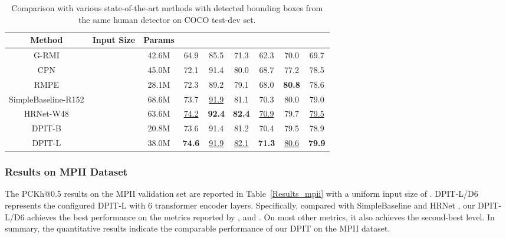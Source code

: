 \documentclass[runningheads]{llncs}
\begin{document}
\begin{center}
\begin{table}
  \caption{Comparison with various state-of-the-art methods with detected bounding boxes from the same human detector on COCO test-dev set.}
  \label{test_coco}
  \begin{center}
  \begin{tabular}{c|c|c|cccccc}
  \toprule
  Method  & Input Size  & Params  &  &   &   &   &  &  \\
  \midrule
  \midrule
   G-RMI \cite{G-RMI2017}  &   & 42.6M  & 64.9 & 85.5  & 71.3 &  62.3  & 70.0 & 69.7    \\
   CPN \cite{CPN2018}  &   & 45.0M  & 72.1 & 91.4  & 80.0  & 68.7  & 77.2 & 78.5    \\
  RMPE \cite{RMPE2017}   &   & 28.1M  & 72.3  & 89.2 & 79.1  & 68.0  & \textbf{80.8}  & 78.6    \\
  SimpleBaseline-R152 \cite{simple_baseline2018}   &   & 68.6M  & 73.7  & \underline{91.9} & 81.1  & 70.3  & 80.0  & 79.0    \\
  HRNet-W48 \cite{HRNet2019}   &   & 63.6M  & \underline{74.2} & \textbf{92.4}  & \textbf{82.4}  & \underline{70.9}  & 79.7 & \underline{79.5}    \\
  \midrule
  DPIT-B   &   & 20.8M  & 73.6 & 91.4  & 81.2  & 70.4  & 79.5 & 78.9    \\
  DPIT-L   &   & 38.0M  & \textbf{74.6} & \underline{91.9}  & \underline{82.1}  & \textbf{71.3}  & \underline{80.6} & \textbf{79.9}    \\
  \bottomrule
  \end{tabular}
  \end{center}
\end{table}
\end{center}


\subsubsection{Results on MPII Dataset}
The PCKh@0.5 results on the MPII validation set are reported in Table~\ref{Results_mpii} with a uniform input size of . DPIT-L/D6 represents the configured DPIT-L with 6 transformer encoder layers. Specifically, compared with SimpleBaseline \cite{simple_baseline2018} and HRNet \cite{HRNet2019}, our DPIT-L/D6 achieves the best performance on the metrics reported by , and . On most other metrics, it also achieves the second-best level. In summary, the quantitative results indicate the comparable performance of our DPIT on the MPII dataset.
\end{document}
